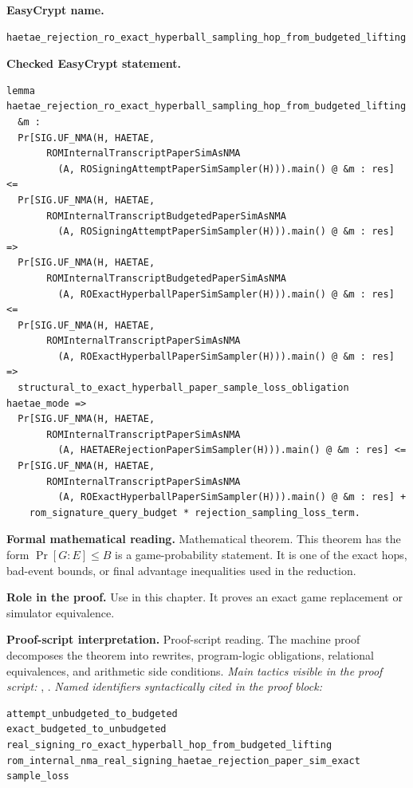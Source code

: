 \begin{formaltheorem}
\noindent\textbf{EasyCrypt name.}
\begin{lstlisting}[language=EasyCrypt,basicstyle=\ttfamily\scriptsize]
haetae_rejection_ro_exact_hyperball_sampling_hop_from_budgeted_lifting
\end{lstlisting}
\noindent\textbf{Checked EasyCrypt statement.}
\begin{lstlisting}[language=EasyCrypt,basicstyle=\ttfamily\scriptsize]
lemma haetae_rejection_ro_exact_hyperball_sampling_hop_from_budgeted_lifting
  &m :
  Pr[SIG.UF_NMA(H, HAETAE,
       ROMInternalTranscriptPaperSimAsNMA
         (A, ROSigningAttemptPaperSimSampler(H))).main() @ &m : res] <=
  Pr[SIG.UF_NMA(H, HAETAE,
       ROMInternalTranscriptBudgetedPaperSimAsNMA
         (A, ROSigningAttemptPaperSimSampler(H))).main() @ &m : res] =>
  Pr[SIG.UF_NMA(H, HAETAE,
       ROMInternalTranscriptBudgetedPaperSimAsNMA
         (A, ROExactHyperballPaperSimSampler(H))).main() @ &m : res] <=
  Pr[SIG.UF_NMA(H, HAETAE,
       ROMInternalTranscriptPaperSimAsNMA
         (A, ROExactHyperballPaperSimSampler(H))).main() @ &m : res] =>
  structural_to_exact_hyperball_paper_sample_loss_obligation haetae_mode =>
  Pr[SIG.UF_NMA(H, HAETAE,
       ROMInternalTranscriptPaperSimAsNMA
         (A, HAETAERejectionPaperSimSampler(H))).main() @ &m : res] <=
  Pr[SIG.UF_NMA(H, HAETAE,
       ROMInternalTranscriptPaperSimAsNMA
         (A, ROExactHyperballPaperSimSampler(H))).main() @ &m : res] +
    rom_signature_query_budget * rejection_sampling_loss_term.
\end{lstlisting}
\noindent\textbf{Formal mathematical reading.}
Mathematical theorem. This theorem has the form \(\Pr[G:E] \le B\) is a game-probability statement.  It is one of the exact hops, bad-event bounds, or final advantage inequalities used in the reduction.

\noindent\textbf{Role in the proof.}
Use in this chapter. It proves an exact game replacement or simulator equivalence.

\noindent\textbf{Proof-script interpretation.}
Proof-script reading. The machine proof decomposes the theorem into rewrites, program-logic obligations, relational equivalences, and arithmetic side conditions.
\emph{Main tactics visible in the proof script:} , .
\emph{Named identifiers syntactically cited in the proof block:}
\begin{lstlisting}[language=EasyCrypt,basicstyle=\ttfamily\scriptsize]
attempt_unbudgeted_to_budgeted
exact_budgeted_to_unbudgeted
real_signing_ro_exact_hyperball_hop_from_budgeted_lifting
rom_internal_nma_real_signing_haetae_rejection_paper_sim_exact
sample_loss
\end{lstlisting}

\end{formaltheorem}

